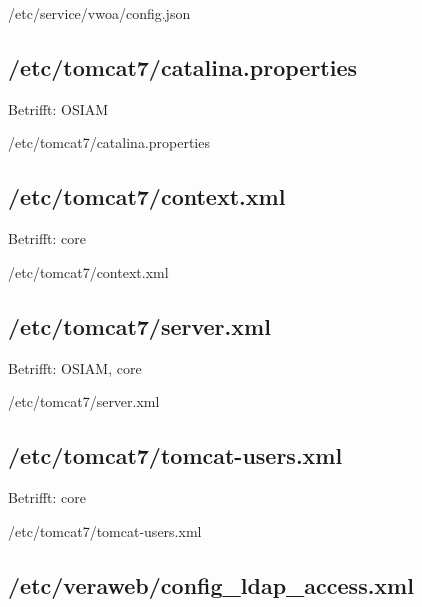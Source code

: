 \begin{lstdump}{/etc/service/vwoa/config.json}
\end{lstdump}

\subsection{/etc/tomcat7/catalina.properties}\label{subsec:refcfg-tc-prop}

Betrifft: OSIAM

\begin{lstdump}{/etc/tomcat7/catalina.properties}
\end{lstdump}

\fi%

\subsection{/etc/tomcat7/context.xml}\label{subsec:refcfg-tc-ctx}

\ifoa
Betrifft: core
\fi%

\begin{lstdump}{/etc/tomcat7/context.xml}
\end{lstdump}

\subsection{/etc/tomcat7/server.xml}\label{subsec:refcfg-tc-server}

\ifoa
Betrifft: OSIAM, core
\fi%

\begin{lstdump}{/etc/tomcat7/server.xml}
\end{lstdump}

\subsection{/etc/tomcat7/tomcat-users.xml}\label{subsec:refcfg-tc-users}

\ifoa
Betrifft: core
\fi%

\begin{lstdump}{/etc/tomcat7/tomcat-users.xml}
\end{lstdump}

\subsection{/etc/veraweb/config\_ldap\_access.xml}\label{subsec:refcfg-vw-cfgldap}

